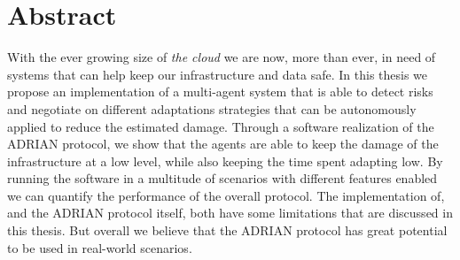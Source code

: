 \section*{Abstract}
With the ever growing size of \textit{the cloud} we are now, more than ever, in need of systems that can help keep our infrastructure and data safe. In this thesis we propose an implementation of a multi-agent system that is able to detect risks and negotiate on different adaptations strategies that can be autonomously applied to reduce the estimated damage. Through a software realization of the ADRIAN protocol, we show that the agents are able to keep the damage of the infrastructure at a low level, while also keeping the time spent adapting low. By running the software in a multitude of scenarios with different features enabled we can quantify the performance of the overall protocol. The implementation of, and the ADRIAN protocol itself, both have some limitations that are discussed in this thesis. But overall we believe that the ADRIAN protocol has great potential to be used in real-world scenarios.
